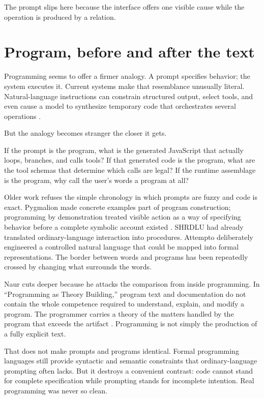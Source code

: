 \documentclass[11pt]{article}
\begin{document}
The prompt slips here because the interface offers one visible cause while the operation is produced by a relation.

\section{Program, before and after the text}

Programming seems to offer a firmer analogy. A prompt specifies behavior; the system executes it. Current systems make that resemblance unusually literal. Natural-language instructions can constrain structured output, select tools, and even cause a model to synthesize temporary code that orchestrates several operations \parencite{openai2026structured,openai2026ptc}.

But the analogy becomes stranger the closer it gets.

If the prompt is the program, what is the generated JavaScript that actually loops, branches, and calls tools? If that generated code is the program, what are the tool schemas that determine which calls are legal? If the runtime assemblage is the program, why call the user's words a program at all?

Older work refuses the simple chronology in which prompts are fuzzy and code is exact. Pygmalion made concrete examples part of program construction; programming by demonstration treated visible action as a way of specifying behavior before a complete symbolic account existed \parencite{smith1993pygmalion}. SHRDLU had already translated ordinary-language interaction into procedures. Attempto deliberately engineered a controlled natural language that could be mapped into formal representations. The border between words and programs has been repeatedly crossed by changing what surrounds the words.

Naur cuts deeper because he attacks the comparison from inside programming. In ``Programming as Theory Building,'' program text and documentation do not contain the whole competence required to understand, explain, and modify a program. The programmer carries a theory of the matters handled by the program that exceeds the artifact \parencite{naur1985programming}. Programming is not simply the production of a fully explicit text.

That does not make prompts and programs identical. Formal programming languages still provide syntactic and semantic constraints that ordinary-language prompting often lacks. But it destroys a convenient contrast: code cannot stand for complete specification while prompting stands for incomplete intention. Real programming was never so clean.
\end{document}
